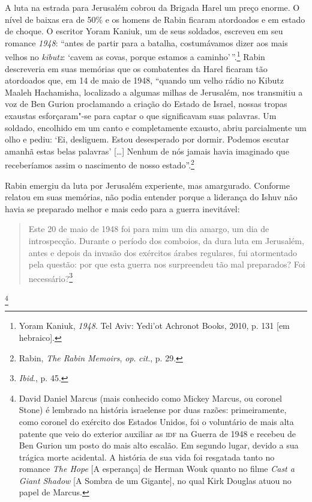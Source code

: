 A luta na estrada para Jerusalém cobrou da Brigada Harel um preço
enorme. O nível de baixas era de 50\% e os homens de Rabin ficaram
atordoados e em estado de choque. O escritor Yoram Kaniuk, um de seus
soldados, escreveu em seu romance \textit{1948}: ``antes de partir para a
batalha, costumávamos dizer aos mais velhos no \textit{kibutz}: `cavem as covas,
porque estamos a caminho'\,''.\footnote{Yoram Kaniuk, \textit{1948}. Tel Aviv: Yedi'ot Achronot Books, 2010, p. 131 {[}em hebraico{]}.} Rabin descreveria em suas
memórias que os combatentes da Harel ficaram tão atordoados que, em 14
de maio de 1948, ``quando um velho rádio no Kibutz Maaleh Hachamisha,
localizado a algumas milhas de Jerusalém, nos transmitiu a voz de Ben
Gurion proclamando a criação do Estado de Israel, nossas tropas exaustas
esforçaram"-se para captar o que significavam suas palavras. Um soldado,
encolhido em um canto e completamente exausto, abriu parcialmente um olho e
pediu: `Ei, desliguem. Estou desesperado por dormir. Podemos escutar
amanhã estas belas palavras' {[}\ldots{}{]} Nenhum de nós jamais havia imaginado que
receberíamos assim o nascimento de nosso estado''.\footnote{Rabin,
\textit{The Rabin Memoirs}, \textit{op}. \textit{cit}., p. 29.}

Rabin emergiu da luta por Jerusalém experiente, mas amargurado. Conforme
relatou em suas memórias, não podia entender porque a liderança do
Ishuv não havia se preparado melhor e mais cedo para a guerra
inevitável: 

\begin{quote}
Este 20 de maio de 1948 foi para mim um dia amargo, um dia
de introspecção. Durante o período dos comboios, da dura luta em
Jerusalém, antes e depois da invasão dos exércitos árabes regulares, fui
atormentado pela questão: por que esta guerra nos surpreendeu tão mal
preparados? Foi necessário?\footnote{\textit{Ibid}., p. 45.}
\end{quote}

\footnote{David Daniel Marcus 
(mais conhecido como Mickey Marcus, ou coronel Stone) é lembrado na história israelense
por duas razões: primeiramente, como coronel do exército
dos Estados Unidos, foi o voluntário de mais alta patente que veio do
exterior auxiliar as \textsc{idf} na Guerra de 1948 e recebeu de Ben Gurion um
posto do mais alto escalão. Em segundo lugar, devido a sua trágica morte
acidental. A história de sua vida foi resgatada tanto no romance \textit{The Hope} {[}A esperança{]} de
Herman Wouk quanto no filme \textit{Cast a Giant Shadow} {[}A Sombra de um
Gigante{]}, no qual Kirk Douglas atuou no papel de Marcus.} 

